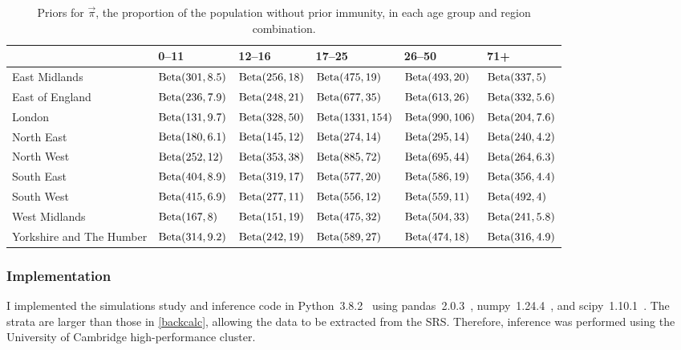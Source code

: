 \documentclass[thesis.tex]{subfiles}
\begin{document}
\begin{landscape}
\begin{table}
\centering
\begin{tabular}{l|lllll}
         & 0--11 & 12--16 & 17--25 & 26--50 & 71+ \\
        \hline
        East Midlands & $\operatorname{Beta}(301, 8.5)$ & $\operatorname{Beta}(256, 18)$ & $\operatorname{Beta}(475, 19)$ & $\operatorname{Beta}(493, 20)$ & $\operatorname{Beta}(337, 5)$ \\
        East of England & $\operatorname{Beta}(236, 7.9)$ & $\operatorname{Beta}(248, 21)$ & $\operatorname{Beta}(677, 35)$ & $\operatorname{Beta}(613, 26)$ & $\operatorname{Beta}(332, 5.6)$ \\
        London & $\operatorname{Beta}(131, 9.7)$ & $\operatorname{Beta}(328, 50)$ & $\operatorname{Beta}(1331, 154)$ & $\operatorname{Beta}(990, 106)$ & $\operatorname{Beta}(204, 7.6)$ \\
        North East & $\operatorname{Beta}(180, 6.1)$ & $\operatorname{Beta}(145, 12)$ & $\operatorname{Beta}(274, 14)$ & $\operatorname{Beta}(295, 14)$ & $\operatorname{Beta}(240, 4.2)$ \\
        North West & $\operatorname{Beta}(252, 12)$ & $\operatorname{Beta}(353, 38)$ & $\operatorname{Beta}(885, 72)$ & $\operatorname{Beta}(695, 44)$ & $\operatorname{Beta}(264, 6.3)$ \\
        South East & $\operatorname{Beta}(404, 8.9)$ & $\operatorname{Beta}(319, 17)$ & $\operatorname{Beta}(577, 20)$ & $\operatorname{Beta}(586, 19)$ & $\operatorname{Beta}(356, 4.4)$ \\
        South West & $\operatorname{Beta}(415, 6.9)$ & $\operatorname{Beta}(277, 11)$ & $\operatorname{Beta}(556, 12)$ & $\operatorname{Beta}(559, 11)$ & $\operatorname{Beta}(492, 4)$ \\
        West Midlands & $\operatorname{Beta}(167, 8)$ & $\operatorname{Beta}(151, 19)$ & $\operatorname{Beta}(475, 32)$ & $\operatorname{Beta}(504, 33)$ & $\operatorname{Beta}(241, 5.8)$ \\
        Yorkshire and The Humber & $\operatorname{Beta}(314, 9.2)$ & $\operatorname{Beta}(242, 19)$ & $\operatorname{Beta}(589, 27)$ & $\operatorname{Beta}(474, 18)$ & $\operatorname{Beta}(316, 4.9)$ \\
    \end{tabular}
\caption{Priors for $\vec{\pi}$, the proportion of the population without prior immunity, in each age group and region combination.}
\label{SEIR:table:immunity-prior}
\end{table}
\end{landscape}

\subsubsection{Implementation}

I implemented the simulations study and inference code in Python~3.8.2~\autocite{python} using pandas~2.0.3~\autocite{pandas}, numpy~1.24.4~\autocite{numpy}, and scipy~1.10.1~\autocite{scipy}.
The strata are larger than those in \cref{backcalc}, allowing the data to be extracted from the SRS.
Therefore, inference was performed using the University of Cambridge high-performance cluster.
\end{document}
